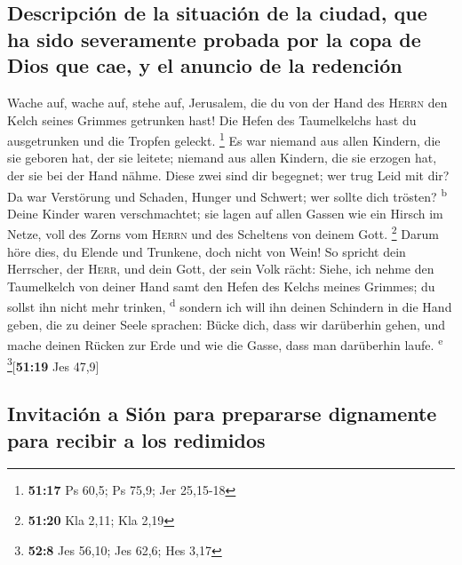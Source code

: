 \hypertarget{descripciuxf3n-de-la-situaciuxf3n-de-la-ciudad-que-ha-sido-severamente-probada-por-la-copa-de-dios-que-cae-y-el-anuncio-de-la-redenciuxf3n}{%
\subsection{Descripción de la situación de la ciudad, que ha sido
severamente probada por la copa de Dios que cae, y el anuncio de la
redención}\label{descripciuxf3n-de-la-situaciuxf3n-de-la-ciudad-que-ha-sido-severamente-probada-por-la-copa-de-dios-que-cae-y-el-anuncio-de-la-redenciuxf3n}}

 Wache auf, wache auf, stehe auf, Jerusalem, die du von
der Hand des \textsc{Herrn} den Kelch seines Grimmes getrunken hast! Die
Hefen des Taumelkelchs hast du ausgetrunken und die Tropfen geleckt.
\footnote{\textbf{51:17} Ps 60,5; Ps 75,9; Jer 25,15-18} 
Es war niemand aus allen Kindern, die sie geboren hat, der sie leitete;
niemand aus allen Kindern, die sie erzogen hat, der sie bei der Hand
nähme.  Diese zwei sind dir begegnet; wer trug Leid mit
dir? Da war Verstörung und Schaden, Hunger und Schwert; wer sollte dich
trösten? \textsuperscript{b}  Deine Kinder waren
verschmachtet; sie lagen auf allen Gassen wie ein Hirsch im Netze, voll
des Zorns vom \textsc{Herrn} und des Scheltens von deinem Gott.
\footnote{\textbf{51:20} Kla 2,11; Kla 2,19}  Darum höre
dies, du Elende und Trunkene, doch nicht von Wein!  So
spricht dein Herrscher, der \textsc{Herr}, und dein Gott, der sein Volk
rächt: Siehe, ich nehme den Taumelkelch von deiner Hand samt den Hefen
des Kelchs meines Grimmes; du sollst ihn nicht mehr trinken,
\textsuperscript{d}  sondern ich will ihn deinen
Schindern in die Hand geben, die zu deiner Seele sprachen: Bücke dich,
dass wir darüberhin gehen, und mache deinen Rücken zur Erde und wie die
Gasse, dass man darüberhin laufe. \textsuperscript{e}
\footnote{\textbf{52:8} Jes 56,10; Jes 62,6; Hes 3,17}{[}\textbf{51:19}
Jes 47,9{]}

\hypertarget{invitaciuxf3n-a-siuxf3n-para-prepararse-dignamente-para-recibir-a-los-redimidos}{%
\subsection{Invitación a Sión para prepararse dignamente para recibir a
los
redimidos}\label{invitaciuxf3n-a-siuxf3n-para-prepararse-dignamente-para-recibir-a-los-redimidos}}


